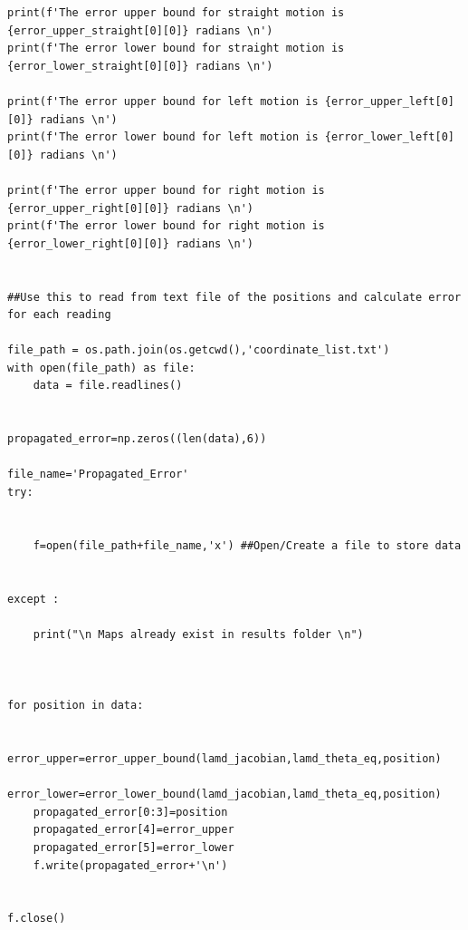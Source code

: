 {\begin{itemize}
\begin{verbatim}
print(f'The error upper bound for straight motion is {error_upper_straight[0][0]} radians \n')
print(f'The error lower bound for straight motion is {error_lower_straight[0][0]} radians \n')

print(f'The error upper bound for left motion is {error_upper_left[0][0]} radians \n')
print(f'The error lower bound for left motion is {error_lower_left[0][0]} radians \n')

print(f'The error upper bound for right motion is {error_upper_right[0][0]} radians \n')
print(f'The error lower bound for right motion is {error_lower_right[0][0]} radians \n')


##Use this to read from text file of the positions and calculate error for each reading

file_path = os.path.join(os.getcwd(),'coordinate_list.txt')
with open(file_path) as file:
    data = file.readlines()


propagated_error=np.zeros((len(data),6))

file_name='Propagated_Error'
try:


    f=open(file_path+file_name,'x') ##Open/Create a file to store data


except :

    print("\n Maps already exist in results folder \n")



for position in data:
    
    error_upper=error_upper_bound(lamd_jacobian,lamd_theta_eq,position)
    error_lower=error_lower_bound(lamd_jacobian,lamd_theta_eq,position)
    propagated_error[0:3]=position
    propagated_error[4]=error_upper
    propagated_error[5]=error_lower
    f.write(propagated_error+'\n')
    
    
f.close()
    
    

    

        
    
    
    
    
    \end{verbatim}    
            
            
        \end{itemize}
    }
    
    

